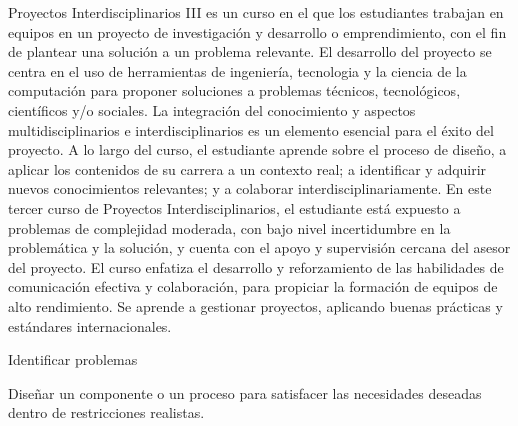 \begin{syllabus}


\begin{justification}
Proyectos Interdisciplinarios III es un curso en el que los estudiantes trabajan en equipos en un proyecto de investigación y desarrollo o emprendimiento, con el fin de plantear una solución a un problema relevante. El desarrollo del proyecto se centra en el uso de herramientas de ingeniería, tecnologia y la ciencia de la computación para proponer soluciones a problemas técnicos, tecnológicos, científicos y/o sociales. La integración del
conocimiento y aspectos multidisciplinarios e interdisciplinarios es un elemento esencial para el éxito del proyecto. A lo largo del curso, el estudiante aprende sobre el proceso de
diseño, a aplicar los contenidos de su carrera a un contexto real; a identificar y adquirir nuevos conocimientos relevantes; y a colaborar interdisciplinariamente. En este tercer curso de Proyectos Interdisciplinarios, el estudiante está expuesto a problemas de complejidad moderada, con bajo nivel incertidumbre en la problemática y la solución, y cuenta con el
apoyo y supervisión cercana del asesor del proyecto. El curso enfatiza el desarrollo y reforzamiento de las habilidades de comunicación efectiva y colaboración, para propiciar la
formación de equipos de alto rendimiento. Se aprende a gestionar proyectos, aplicando buenas prácticas y estándares internacionales.
\end{justification}

\begin{goals}
   \item Identificar problemas
   \item Diseñar un componente o un proceso para satisfacer las necesidades deseadas dentro de restricciones realistas.  
\end{goals}

\begin{outcomes}
   \item {}
   \item {}
\end{outcomes}

\begin{competences}
    \item {}
    \item {}
\end{competences}


\end{syllabus}
